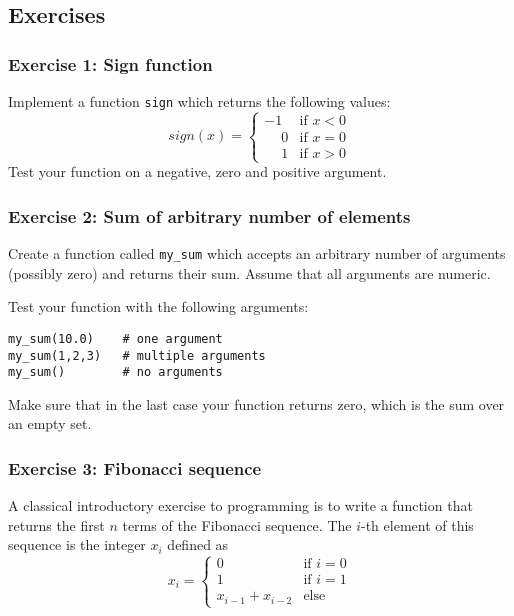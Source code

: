 \documentclass[10pt]{scrartcl}
\begin{document}
\hypertarget{exercises}{%
\subsection{Exercises}\label{exercises}}

    \hypertarget{exercise-1-sign-function}{%
\subsubsection{Exercise 1: Sign
function}\label{exercise-1-sign-function}}

Implement a function \texttt{sign} which returns the following values:
\[
sign(x) = 
\begin{cases}
-1 & \text{if } x < 0 \\
\phantom{-} 0 & \text{if } x = 0 \\
\phantom{-} 1 & \text{if } x > 0
\end{cases}
\] Test your function on a negative, zero and positive argument.

    \hypertarget{exercise-2-sum-of-arbitrary-number-of-elements}{%
\subsubsection{Exercise 2: Sum of arbitrary number of
elements}\label{exercise-2-sum-of-arbitrary-number-of-elements}}

Create a function called \texttt{my\_sum} which accepts an arbitrary
number of arguments (possibly zero) and returns their sum. Assume that
all arguments are numeric.

Test your function with the following arguments:

\begin{verbatim}
my_sum(10.0)    # one argument
my_sum(1,2,3)   # multiple arguments
my_sum()        # no arguments
\end{verbatim}

Make sure that in the last case your function returns zero, which is the
sum over an empty set.

    \hypertarget{exercise-3-fibonacci-sequence}{%
\subsubsection{Exercise 3: Fibonacci
sequence}\label{exercise-3-fibonacci-sequence}}

A classical introductory exercise to programming is to write a function
that returns the first \(n\) terms of the Fibonacci sequence. The
\(i\)-th element of this sequence is the integer \(x_i\) defined as \[
x_i = 
\begin{cases} 0 & \text{if } i = 0   \\
    1  & \text{if } i = 1\\
    x_{i-1} + x_{i-2} & \text{else}
\end{cases}
\]
\end{document}
